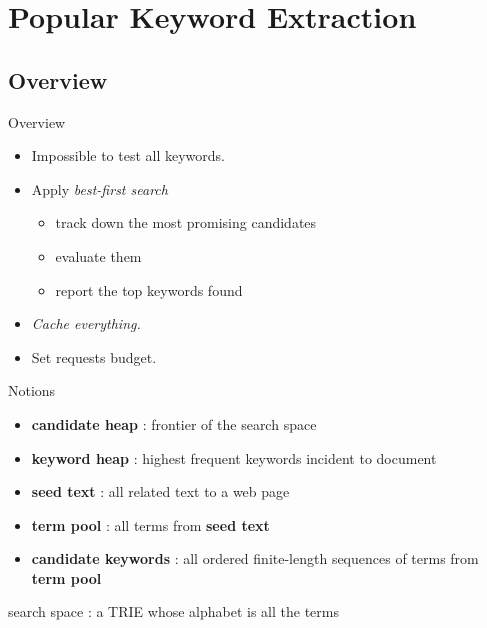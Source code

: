 \documentclass{beamer}
\newcommand{\cheap}{\textbf{candidate heap} }
\newcommand{\kheap}{\textbf{keyword heap} }
\begin{document}
\section{Popular Keyword Extraction}

    \subsection{Overview}
    \begin{frame} {Overview}
        \begin{itemize}
        \item Impossible to test all keywords.
        \item Apply \em{best-first} search 
            \begin{itemize}
            \item track down the most promising candidates
            \item evaluate them
            \item report the top keywords found
            \end{itemize}
        \item \em{Cache} everything.
        \item Set requests budget.
        \end{itemize}
    \end{frame}

    \begin{frame}{Notions}
        \begin{itemize}
        \item \cheap : frontier of the search space
        \item \kheap : highest frequent keywords incident to document
        \item \textbf{seed text} : all related text to a web page
        \item \textbf{term pool} : all terms from \textbf{seed text}
        \item \textbf{candidate keywords} : all ordered finite-length sequences of terms from \textbf{term pool} 
        \end{itemize}
        \alert{search space} : a TRIE whose alphabet is all the terms
    \end{frame}
\end{document}
